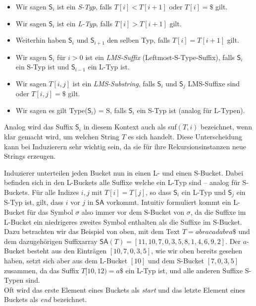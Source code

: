 \begin{itemize}
\item Wir sagen $\mathsf{S}_i$ ist ein \textit{S-Typ}, falls $T[i] < T[i+1]$ oder $T[i] = \$$ gilt.
\item Wir sagen $\mathsf{S}_i$ ist ein \textit{L-Typ}, falls $T[i] > T[i+1]$ gilt.
\item Weiterhin haben $\mathsf{S}_i$ und $\mathsf{S}_{i+1}$ den selben Typ, falls $T[i] = T[i+1]$ gilt.
\item Wir sagen $\mathsf{S}_i$ für $i > 0$ ist ein \textit{LMS-Suffix} (Leftmost-S-Type-Suffix), falls $\mathsf{S}_i$ ein S-Typ ist und $\mathsf{S}_{i-1}$ ein L-Typ ist.
\item Wir sagen $T[i,j]$ ist ein \textit{LMS-Substring}, falls $\mathsf{S}_i$ und $\mathsf{S}_j$ LMS-Suffixe sind oder $T[i,j] = \$$ gilt.
\item Wir sagen es gilt Type($\mathsf{S}_i$) = S, falls $\mathsf{S}_i$ ein S-Typ ist (analog für L-Typen).
\end{itemize}

Analog wird das Suffix $\mathsf{S}_i$ in diesem Kontext auch als suf$(T,i)$ bezeichnet, wenn klar gemacht wird, um welchen String $T$ es sich handelt. Diese Unterscheidung kann bei Induzierern sehr wichtig sein, da sie für ihre Rekursionsinstanzen neue Strings erzeugen.

Induzierer unterteilen jeden Bucket nun in einen L- und einen S-Bucket. Dabei befinden sich in den L-Buckets alle Suffixe welche ein L-Typ sind -- analog für S-Buckets. Für alle Indizes $i,j$ mit $T[i] = T[j]$, so dass $\mathsf{S}_i$ ein L-Typ und $\mathsf{S}_j$ ein S-Typ ist, gilt, dass $i$ vor $j$ in $\mathsf{SA}$ vorkommt. Intuitiv formuliert kommt ein L-Bucket für das Symbol $\sigma$ also immer vor dem S-Bucket von $\sigma$, da die Suffixe im L-Bucket ein niedrigeres zweites Symbol enthalten als die Suffixe im S-Bucket. \\
Dazu betrachten wir das Beispiel von oben, mit dem Text $T = abracadabra\$$ und dem dazugehörigen Suffixarray $\mathsf{SA}(T) = [11, 10, 7, 0, 3, 5, 8, 1, 4, 6, 9, 2]$. Der $a$-Bucket besteht aus den Einträgen $[10,7,0,3,5]$, wie wir oben bereits gesehen haben, setzt sich aber aus dem L-Bucket $[10]$ und dem S-Bucket $[7,0,3,5]$ zusammen, da das Suffix $T[10,12) = a\$$ ein L-Typ ist, und alle anderen Suffixe S-Typen sind. \\
Oft wird das erste Element eines Buckets als \textit{start} und das letzte Element eines Buckets als \textit{end} bezeichnet. \\


